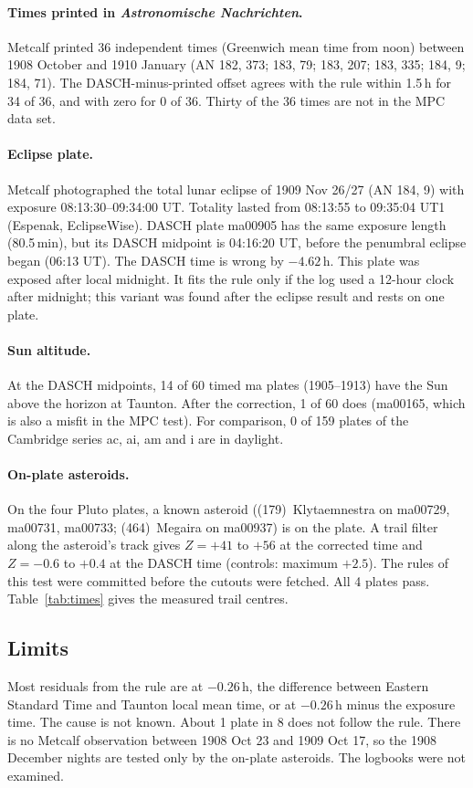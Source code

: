 \documentclass[11pt]{article}
\begin{document}
\paragraph{Times printed in \emph{Astronomische Nachrichten}.} Metcalf printed 36 independent times (Greenwich mean time from noon) between 1908 October and 1910 January (AN 182, 373; 183, 79; 183, 207; 183, 335; 184, 9; 184, 71). The DASCH-minus-printed offset agrees with the rule within 1.5\,h for 34 of 36, and with zero for 0 of 36. Thirty of the 36 times are not in the MPC data set.

\paragraph{Eclipse plate.} Metcalf photographed the total lunar eclipse of 1909 Nov 26/27 (AN 184, 9) with exposure 08:13:30--09:34:00 UT. Totality lasted from 08:13:55 to 09:35:04 UT1 (Espenak, EclipseWise). DASCH plate ma00905 has the same exposure length (80.5\,min), but its DASCH midpoint is 04:16:20 UT, before the penumbral eclipse began (06:13 UT). The DASCH time is wrong by $-4.62$\,h. This plate was exposed after local midnight. It fits the rule only if the log used a 12-hour clock after midnight; this variant was found after the eclipse result and rests on one plate.

\paragraph{Sun altitude.} At the DASCH midpoints, 14 of 60 timed ma plates (1905--1913) have the Sun above the horizon at Taunton. After the correction, 1 of 60 does (ma00165, which is also a misfit in the MPC test). For comparison, 0 of 159 plates of the Cambridge series ac, ai, am and i are in daylight.

\paragraph{On-plate asteroids.} On the four Pluto plates, a known asteroid ((179)~Klytaemnestra on ma00729, ma00731, ma00733; (464)~Megaira on ma00937) is on the plate. A trail filter along the asteroid's track gives $Z=+41$ to $+56$ at the corrected time and $Z=-0.6$ to $+0.4$ at the DASCH time (controls: maximum $+2.5$). The rules of this test were committed before the cutouts were fetched. All 4 plates pass. Table~\ref{tab:times} gives the measured trail centres.

\subsection{Limits}
Most residuals from the rule are at $-0.26$\,h, the difference between Eastern Standard Time and Taunton local mean time, or at $-0.26$\,h minus the exposure time. The cause is not known. About 1 plate in 8 does not follow the rule. There is no Metcalf observation between 1908 Oct 23 and 1909 Oct 17, so the 1908 December nights are tested only by the on-plate asteroids. The logbooks were not examined.
\end{document}
